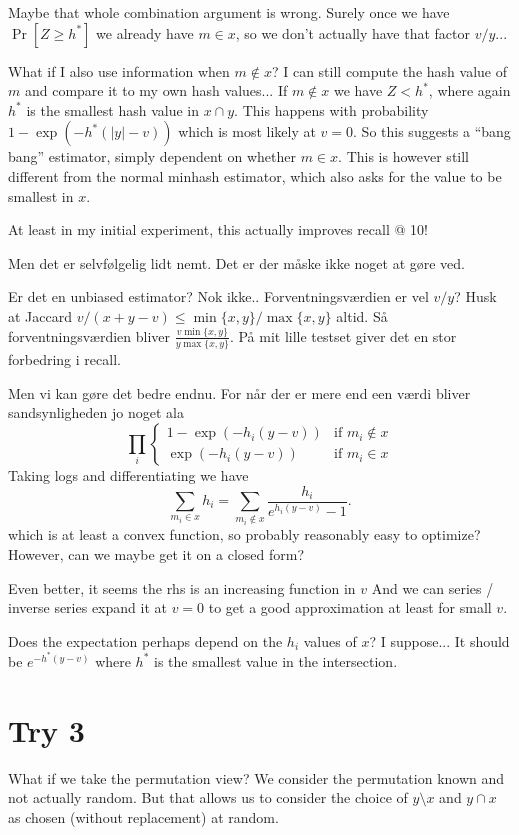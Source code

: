 Maybe that whole combination argument is wrong.
Surely once we have $\Pr[Z\ge h^*]$ we already have $m\in x$, so we don't actually have that factor $v/y$...

What if I also use information when $m\not\in x$?
I can still compute the hash value of $m$ and compare it to my own hash values...
If $m\not\in x$ we have $Z < h^*$, where again $h^*$ is the smallest hash value in $x\cap y$.
This happens with probability $1-\exp(-h^*(|y|-v))$ which is most likely at $v=0$.
So this suggests a ``bang bang'' estimator, simply dependent on whether $m\in x$.
This is however still different from the normal minhash estimator, which also asks for the value to be smallest in $x$.

At least in my initial experiment, this actually improves recall @ 10!

Men det er selvfølgelig lidt nemt.
Det er der måske ikke noget at gøre ved.

Er det en unbiased estimator?
Nok ikke..
Forventningsværdien er vel $v/y$?
Husk at Jaccard $v/(x+y-v)\le \min\{x,y\}/\max\{x,y\}$ altid.
Så forventningsværdien bliver $\frac{v\min\{x,y\}}{y\max\{x,y\}}$.
På mit lille testset giver det en stor forbedring i recall.

Men vi kan gøre det bedre endnu. For når der er mere end een værdi bliver sandsynligheden jo noget ala
\[
   \prod_i \begin{cases} 1-\exp(-h_i(y-v)) & \text{if } m_i \not\in x \\
   \exp(-h_i(y-v)) & \text{if } m_i \in x \end{cases}
\]
Taking logs and differentiating we have
\[
   \sum_{m_i\in x}{h_i}
   = \sum_{m_i\not\in x}\frac{h_i}{e^{h_i(y-v)}-1}.
\]
which is at least a convex function, so probably reasonably easy to optimize?
However, can we maybe get it on a closed form?

Even better, it seems the rhs is an increasing function in $v$
And we can series / inverse series expand it at $v=0$ to get a good approximation at least for small $v$.

Does the expectation perhaps depend on the $h_i$ values of $x$?
I suppose...
It should be $e^{-h^*(y-v)}$
where $h^*$ is the smallest value in the intersection.

\section{Try 3}

What if we take the permutation view?
We consider the permutation known and not actually random.
But that allows us to consider the choice of $y\setminus x$ and $y\cap x$ as chosen (without replacement) at random.

